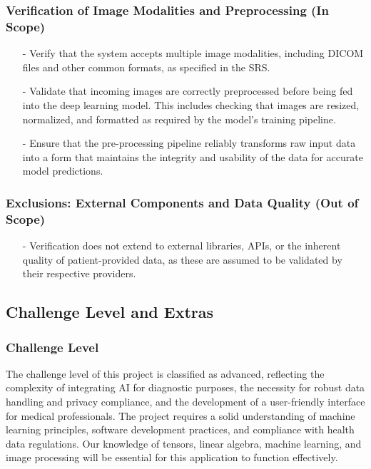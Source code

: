 \documentclass[12pt, titlepage]{article}
\begin{document}
    \subsubsection{Verification of Image Modalities and Preprocessing (In Scope)}
    \begin{itemize}
        \item[-] Verify that the system accepts multiple image modalities, including DICOM files and other common formats, as specified in the SRS.
        \item[-] Validate that incoming images are correctly preprocessed before being fed into the deep learning model. This includes checking that images are resized, normalized, and formatted as required by the model's training pipeline.
        \item[-] Ensure that the pre-processing pipeline reliably transforms raw input data into a form that maintains the integrity and usability of the data for accurate model predictions.

    \end{itemize}
    
   \subsubsection{Exclusions: External Components and Data Quality (Out of Scope)}
   \begin{itemize}
        \item[-] Verification does not extend to external libraries, APIs, or the inherent quality of patient-provided data, as these are assumed to be validated by their respective providers.
    \end{itemize}
\subsection{Challenge Level and Extras}

\subsubsection{Challenge Level}

The challenge level of this project is classified as advanced, reflecting the complexity of integrating AI for diagnostic purposes, the necessity for robust data handling and privacy compliance, and the development of a user-friendly interface for medical professionals. The project requires a solid understanding of machine learning principles, software development practices, and compliance with health data regulations. Our knowledge of tensors, linear algebra, machine learning, and image processing will be essential for this application to function effectively.
\end{document}
